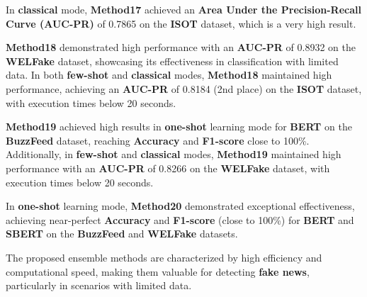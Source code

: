 {	In \textbf{classical} mode, \textbf{Method17} achieved an \textbf{Area Under the Precision-Recall Curve (AUC-PR)} of 0.7865 on the \textbf{ISOT} dataset, which is a very high result.

	\textbf{Method18} demonstrated high performance with an \textbf{AUC-PR} of 0.8932 on the \textbf{WELFake} dataset, showcasing its effectiveness in classification with limited data. In both \textbf{few-shot} and \textbf{classical} modes, \textbf{Method18} maintained high performance, achieving an \textbf{AUC-PR} of 0.8184 (2nd place) on the \textbf{ISOT} dataset, with execution times below 20 seconds.

	\textbf{Method19} achieved high results in \textbf{one-shot} learning mode for \textbf{BERT} on the \textbf{BuzzFeed} dataset, reaching \textbf{Accuracy} and \textbf{F1-score} close to 100\%. Additionally, in \textbf{few-shot} and \textbf{classical} modes, \textbf{Method19} maintained high performance with an \textbf{AUC-PR} of 0.8266 on the \textbf{WELFake} dataset, with execution times below 20 seconds.

	In \textbf{one-shot} learning mode, \textbf{Method20} demonstrated exceptional effectiveness, achieving near-perfect \textbf{Accuracy} and \textbf{F1-score} (close to 100\%) for \textbf{BERT} and \textbf{SBERT} on the \textbf{BuzzFeed} and \textbf{WELFake} datasets.

	The proposed ensemble methods are characterized by high efficiency and computational speed, making them valuable for detecting \textbf{fake news}, particularly in scenarios with limited data.
}